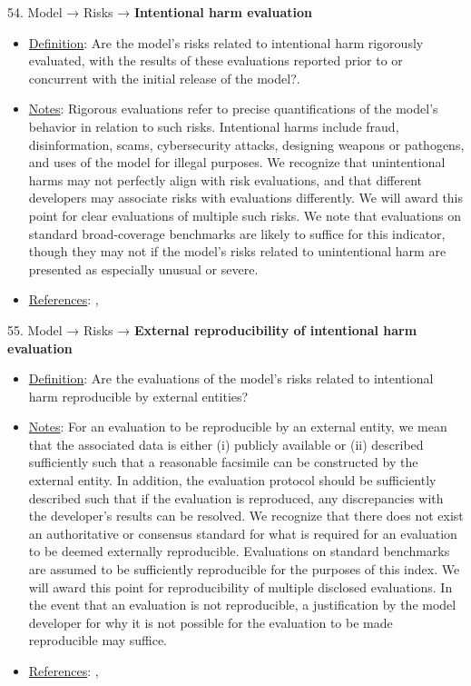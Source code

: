 54. Model → Risks → \textbf{Intentional harm evaluation}
\vspace{-\parskip}
\begin{itemize}
	\item
	\underline{Definition}: Are the model’s risks related to intentional harm rigorously evaluated, with the results of these evaluations reported prior to or concurrent with the initial release of the model?.
	\item
	\underline{Notes}: Rigorous evaluations refer to precise quantifications of the model's behavior in relation to such risks. Intentional harms include fraud, disinformation, scams, cybersecurity attacks, designing weapons or pathogens, and uses of the model for illegal purposes. We recognize that unintentional harms may not perfectly align with risk evaluations, and that different developers may associate risks with evaluations differently. We will award this point for clear evaluations of multiple such risks. We note that evaluations on standard broad-coverage benchmarks are likely to suffice for this indicator, though they may not if the model's risks related to unintentional harm are presented as especially unusual or severe.
	\item
	\underline{References}: \citet{solaiman2023evaluating}, \citet{weidinger2021ethical}
\end{itemize}


55. Model → Risks → \textbf{External reproducibility of intentional harm evaluation}
\vspace{-\parskip}
\begin{itemize}
	\item
	\underline{Definition}: Are the evaluations of the model’s risks related to intentional harm reproducible by external entities?
	\item
	\underline{Notes}: For an evaluation to be reproducible by an external entity, we mean that the associated data is either (i) publicly available or (ii) described sufficiently such that a reasonable facsimile can be constructed by the external entity. In addition, the evaluation protocol should be sufficiently described such that if the evaluation is reproduced, any discrepancies with the developer's results can be resolved. We recognize that there does not exist an authoritative or consensus standard for what is required for an evaluation to be deemed externally reproducible. Evaluations on standard benchmarks are assumed to be sufficiently reproducible for the purposes of this index. We will award this point for reproducibility of multiple disclosed evaluations. In the event that an evaluation is not reproducible, a justification by the model developer for why it is not possible for the evaluation to be made reproducible may suffice.
	\item
	\underline{References}: \citet{kapoor2023leakage}, \citet{weidinger2021ethical}
\end{itemize}



